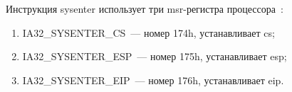 \begin{table}
\begin{center}
\vspace*{-3pt}





\parbox{224pt}{


}


\end{center}


\vspace*{-3pt}


\end{table}











     Инструкция {\sf sysenter} использует три {\sf msr}-ре\-гист\-ра процессора~\cite{11-g}:


     \begin{enumerate}[(1)]


\item {\sf IA32\_SYSENTER\_CS}~--- номер {\sf 174h}, устанавливает {\sf cs};


\item {\sf IA32\_SYSENTER\_ESP}~--- номер {\sf 175h}, устанавливает {\sf esp};


\item {\sf IA32\_SYSENTER\_EIP}~--- номер {\sf 176h}, устанавливает {\sf eip}.


\end{enumerate}











